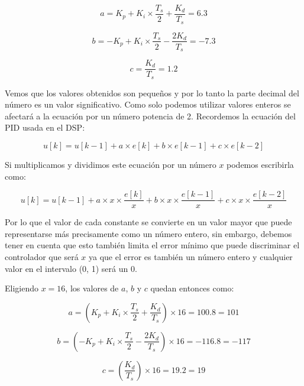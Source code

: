 \documentclass[12pt]{report}
\begin{document}
\begin{equation}
	a = K_p + K_i \times \frac{T_s}{2} + \frac{K_d}{T_s} = 6.3
\end{equation}

\begin{equation}
	b = -K_p + K_i \times \frac{T_s}{2} - \frac{2K_d}{T_s} = -7.3
\end{equation}

\begin{equation}
	c = \frac{K_d}{T_s} = 1.2
\end{equation}

Vemos que los valores obtenidos son pequeños y por lo tanto la parte decimal del número es un valor significativo. Como solo podemos utilizar valores enteros se afectará a la ecuación por un número potencia de 2. Recordemos la ecuación del PID usada en el DSP:

\begin{equation}
	u[k] = u[k-1] + a \times e[k] + b \times e[k-1] + c \times e[k-2]
\end{equation}


Si multiplicamos y dividimos este ecuación por un número $x$ podemos escribirla como:

\begin{equation}
	u[k] = u[k-1] + a \times x \times \frac{e[k]}{x} + b \times x \times \frac{e[k-1]}{x} + c \times x \times \frac{e[k-2]}{x}
\end{equation}

Por lo que el valor de cada constante se convierte en un valor mayor que puede representarse más precisamente como un número entero, sin embargo, debemos tener en cuenta que esto también limita el error mínimo que puede discriminar el controlador que será $x$ ya que el error es también un número entero y cualquier valor en el intervalo (0, 1) será un 0.

Eligiendo $x = 16$, los valores de $a$, $b$ y $c$ quedan entonces como:

\begin{equation}
a = (K_p + K_i \times \frac{T_s}{2} + \frac{K_d}{T_s}) \times 16 = 100.8 = 101
\end{equation}

\begin{equation}
b = (-K_p + K_i \times \frac{T_s}{2} - \frac{2K_d}{T_s}) \times 16 = -116.8 = -117
\end{equation}

\begin{equation}
c = (\frac{K_d}{T_s}) \times 16 = 19.2 = 19
\end{equation}
\end{document}

